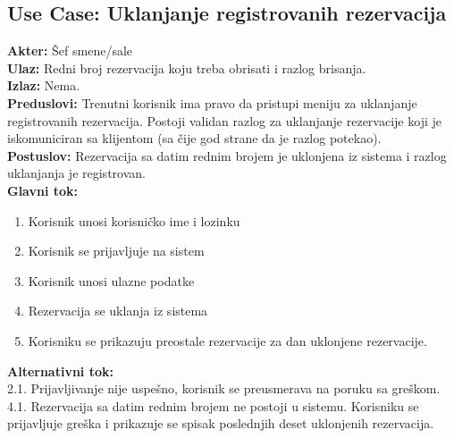 \documentclass{article}
\begin{document}
\subsection{\textbf{Use Case}: Uklanjanje registrovanih rezervacija}
\textbf{Akter:} Šef smene/sale\\
\textbf{Ulaz:} Redni broj rezervacija koju treba obrisati i razlog brisanja.\\
\textbf{Izlaz:} Nema.\\
\textbf{Preduslovi:} Trenutni korisnik ima pravo da pristupi meniju za uklanjanje registrovanih rezervacija. Postoji validan razlog za uklanjanje rezervacije koji je iskomuniciran sa klijentom (sa čije god strane da je razlog potekao).\\
\textbf{Postuslov:} Rezervacija sa datim rednim brojem je uklonjena iz sistema i razlog uklanjanja je registrovan.\\
\textbf{Glavni tok:}
\begin{enumerate}
\item Korisnik unosi korisničko ime i lozinku
\item Korisnik se prijavljuje na sistem
\item Korisnik unosi ulazne podatke
\item Rezervacija se uklanja iz sistema
\item Korisniku se prikazuju preostale rezervacije za dan uklonjene rezervacije.\\
\end{enumerate}
\textbf{Alternativni tok:}\\
       2.1. Prijavljivanje nije uspešno, korisnik se preusmerava na poruku sa greškom.\\
	   4.1. Rezervacija sa datim rednim brojem ne postoji u sistemu. Korisniku se prijavljuje greška i prikazuje se spisak poslednjih deset uklonjenih rezervacija.\\
\end{document}
